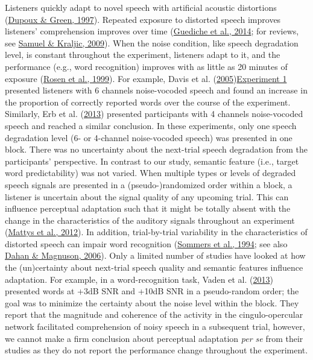 \documentclass[a4paper, nobind]{templates/ociamthesis}
\begin{document}
Listeners quickly adapt to novel speech with artificial acoustic distortions (\protect\hyperlink{ref-Dupoux1997}{Dupoux \& Green, 1997}).
Repeated exposure to distorted speech improves listeners' comprehension improves over time (\protect\hyperlink{ref-Guediche2014}{Guediche et al., 2014}; for reviews, see \protect\hyperlink{ref-Samuel2009}{Samuel \& Kraljic, 2009}).
When the noise condition, like speech degradation level, is constant throughout the experiment, listeners adapt to it, and the performance (e.g., word recognition) improves with as little as 20 minutes of exposure (\protect\hyperlink{ref-Rosen1999}{Rosen et al., 1999}).
For example, Davis et al. (\protect\hyperlink{ref-Davis2005}{2005})\protect\hyperlink{experiment-1}{Experiment 1} presented listeners with 6 channels noise-vocoded speech and found an increase in the proportion of correctly reported words over the course of the experiment.
Similarly, Erb et al. (\protect\hyperlink{ref-Erb2013}{2013}) presented participants with 4 channels noise-vocoded speech and reached a similar conclusion.
In these experiments, only one speech degradation level (6- or 4-channel noise-vocoded speech) was presented in one block.
There was no uncertainty about the next-trial speech degradation from the participants' perspective.
In contrast to our study, semantic feature (i.e., target word predictability) was not varied.
When multiple types or levels of degraded speech signals are presented in a (pseudo-)randomized order within a block, a listener is uncertain about the signal quality of any upcoming trial.
This can influence perceptual adaptation such that
it might be totally absent with the change in the characteristics of the auditory signals throughout an experiment (\protect\hyperlink{ref-Mattys2012}{Mattys et al., 2012}).
In addition, trial-by-trial variability in the characteristics of distorted speech can impair word recognition (\protect\hyperlink{ref-Sommers1994}{Sommers et al., 1994}; see also \protect\hyperlink{ref-Dahan2006}{Dahan \& Magnuson, 2006}).
Only a limited number of studies have looked at how the (un)certainty about next-trial speech quality and semantic features influence adaptation.
For example, in a word-recognition task, Vaden et al. (\protect\hyperlink{ref-Vaden2013}{2013}) presented words at +3dB SNR and +10dB SNR in a pseudo-random order;
the goal was to minimize the certainty about the noise level within the block.
They report that the magnitude and coherence of the activity in the cingulo-opercular network facilitated comprehension of noisy speech in a subsequent trial,
however, we cannot make a firm conclusion about perceptual adaptation \emph{per se} from their studies as they do not report the performance change throughout the experiment.
\end{document}
